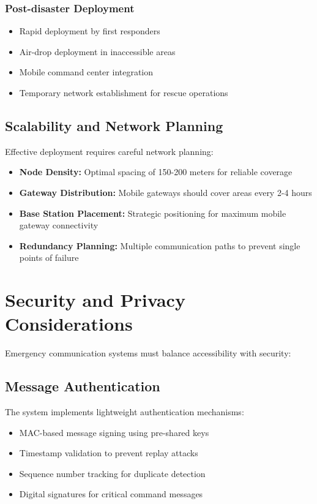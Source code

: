 \documentclass[conference]{IEEEtran}
\begin{document}
\subsubsection{Post-disaster Deployment}
\begin{itemize}
\item Rapid deployment by first responders
\item Air-drop deployment in inaccessible areas
\item Mobile command center integration
\item Temporary network establishment for rescue operations
\end{itemize}

\subsection{Scalability and Network Planning}

Effective deployment requires careful network planning:

\begin{itemize}
\item \textbf{Node Density:} Optimal spacing of 150-200 meters for reliable coverage
\item \textbf{Gateway Distribution:} Mobile gateways should cover areas every 2-4 hours
\item \textbf{Base Station Placement:} Strategic positioning for maximum mobile gateway connectivity
\item \textbf{Redundancy Planning:} Multiple communication paths to prevent single points of failure
\end{itemize}

\section{Security and Privacy Considerations}

Emergency communication systems must balance accessibility with security:

\subsection{Message Authentication}

The system implements lightweight authentication mechanisms:

\begin{itemize}
\item MAC-based message signing using pre-shared keys
\item Timestamp validation to prevent replay attacks
\item Sequence number tracking for duplicate detection
\item Digital signatures for critical command messages
\end{itemize}
\end{document}
